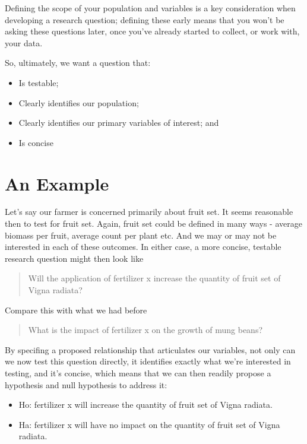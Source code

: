 \documentclass[
]{book}
\providecommand{\tightlist}{%
  \setlength{\itemsep}{0pt}\setlength{\parskip}{0pt}}
\begin{document}
Defining the scope of your population and variables is a key consideration when developing a research question; defining these early means that you won't be asking these questions later, once you've already started to collect, or work with, your data.

So, ultimately, we want a question that:

\begin{itemize}
\tightlist
\item
  Is testable;
\item
  Clearly identifies our population;
\item
  Clearly identifies our primary variables of interest; and
\item
  Is concise
\end{itemize}

\hypertarget{an-example}{%
\section*{An Example}\label{an-example}}

Let's say our farmer is concerned primarily about fruit set. It seems reasonable then to test for fruit set. Again, fruit set could be defined in many ways - average biomass per fruit, average count per plant etc. And we may or may not be interested in each of these outcomes. In either case, a more concise, testable research question might then look like

\begin{quote}
Will the application of fertilizer x increase the quantity of fruit set of Vigna radiata?
\end{quote}

Compare this with what we had before

\begin{quote}
What is the impact of fertilizer x on the growth of mung beans?
\end{quote}

By specifing a proposed relationship that articulates our variables, not only can we now test this question directly, it identifies exactly what we're interested in testing, and it's concise, which means that we can then readily propose a hypothesis and null hypothesis to address it:

\begin{itemize}
\tightlist
\item
  Ho: fertilizer x will increase the quantity of fruit set of Vigna radiata.
\item
  Ha: fertilizer x will have no impact on the quantity of fruit set of Vigna radiata.
\end{itemize}
\end{document}
